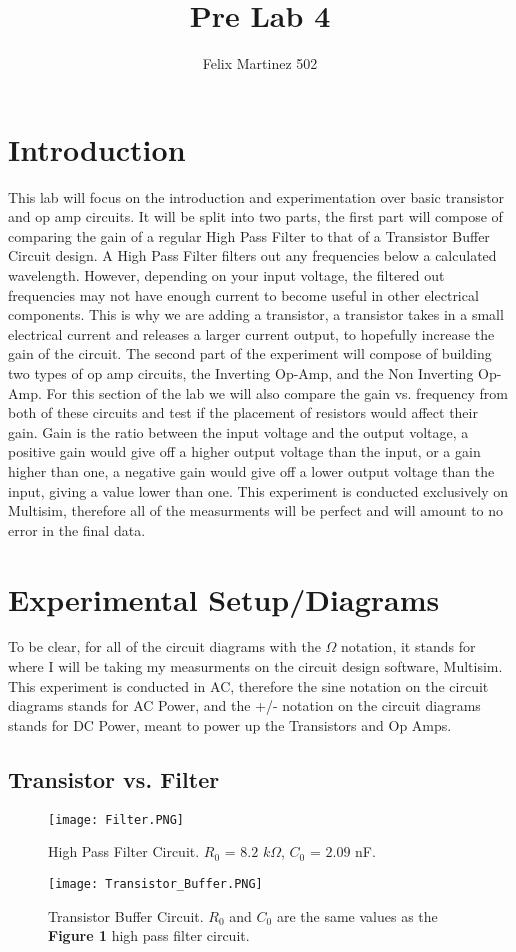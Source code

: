 \documentclass[journal]{IEEEtran}
\begin{document}
\title{Pre Lab 4}  
\author{Felix Martinez 502}
\maketitle
\section{\textbf{Introduction}}
This lab will focus on the introduction and experimentation over
basic transistor and op amp circuits. It will be split into two
parts, the first part will compose of comparing the gain of 
a regular High Pass Filter to that of a Transistor Buffer
Circuit design. A High Pass Filter filters out any 
frequencies below a calculated wavelength. However, depending 
on your input voltage, the filtered out frequencies may not 
have enough current to become useful in other electrical 
components. This is why we are adding a transistor, a
transistor takes in a small electrical current and releases a 
larger current output, to hopefully increase the gain of the 
circuit. The second part of the experiment will compose of 
building two types of op amp circuits, the Inverting Op-Amp, 
and the Non Inverting Op-Amp. For this section of the lab we 
will also compare the gain vs. frequency from both of these 
circuits and test if the placement of resistors would affect 
their gain. Gain is the ratio between the input voltage and 
the output voltage, a positive gain would give off a higher 
output voltage than the input, or a gain higher than one, a 
negative gain would give off a lower output voltage than the 
input, giving a value lower than one. This experiment is conducted exclusively on 
Multisim, therefore all of the measurments will be perfect and will amount to no error 
in the final data.

\section{\textbf{Experimental Setup/Diagrams}}
To be clear, for all of the circuit diagrams with the $\Omega$ 
notation, it stands for where I will be taking my measurments on the circuit design 
software, Multisim. This experiment is conducted in AC, therefore the sine notation on the 
circuit diagrams stands for AC Power, and the +/- notation on the circuit diagrams stands for
DC Power, meant to power up the Transistors and Op Amps.

\subsection{Transistor vs. Filter} 
\begin{figure}[H]
    \centering
    \texttt{[image: Filter.PNG]}
    \caption{High Pass Filter Circuit. $R_0$ = $8.2$ $k\Omega$, $C_0$ = $2.09$ nF.}
\end{figure}
\begin{figure}[H]
    \centering
    \texttt{[image: Transistor\_Buffer.PNG]}
    \caption{Transistor Buffer Circuit. $R_0$ and $C_0$ are the 
    same values as the \textbf{Figure 1} high pass filter circuit.}
\end{figure}
\end{document}

